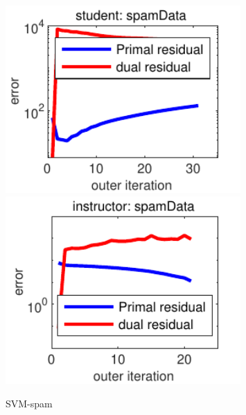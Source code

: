 \documentclass[12pt]{article}
\begin{document}
\begin{figure}\caption{SVM-spam}
\begin{center}
\includegraphics[width=0.8\textwidth]{student_spam.pdf} 
\includegraphics[width=0.8\textwidth]{instructor_spam.pdf} 
\end{center}
\end{figure}
\end{document}
